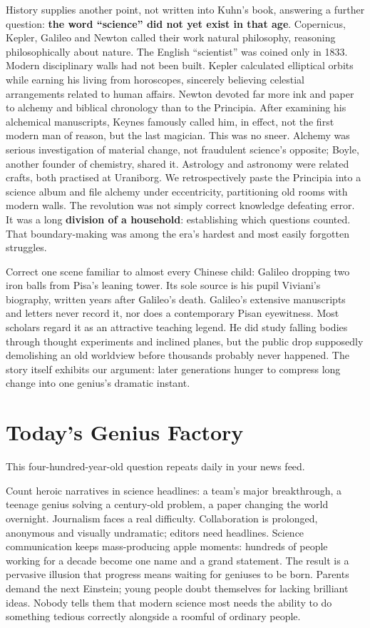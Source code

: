 History supplies another point, not written into Kuhn's book, answering a further question: \textbf{the word ``science'' did not yet exist in that age}. Copernicus, Kepler, Galileo and Newton called their work natural philosophy, reasoning philosophically about nature. The English ``scientist'' was coined only in 1833. Modern disciplinary walls had not been built. Kepler calculated elliptical orbits while earning his living from horoscopes, sincerely believing celestial arrangements related to human affairs. Newton devoted far more ink and paper to alchemy and biblical chronology than to the Principia. After examining his alchemical manuscripts, Keynes famously called him, in effect, not the first modern man of reason, but the last magician. This was no sneer. Alchemy was serious investigation of material change, not fraudulent science's opposite; Boyle, another founder of chemistry, shared it. Astrology and astronomy were related crafts, both practised at Uraniborg. We retrospectively paste the Principia into a science album and file alchemy under eccentricity, partitioning old rooms with modern walls. The revolution was not simply correct knowledge defeating error. It was a long \textbf{division of a household}: establishing which questions counted. That boundary-making was among the era's hardest and most easily forgotten struggles.

Correct one scene familiar to almost every Chinese child: Galileo dropping two iron balls from Pisa's leaning tower. Its sole source is his pupil Viviani's biography, written years after Galileo's death. Galileo's extensive manuscripts and letters never record it, nor does a contemporary Pisan eyewitness. Most scholars regard it as an attractive teaching legend. He did study falling bodies through thought experiments and inclined planes, but the public drop supposedly demolishing an old worldview before thousands probably never happened. The story itself exhibits our argument: later generations hunger to compress long change into one genius's dramatic instant.

\section{Today's Genius Factory}
This four-hundred-year-old question repeats daily in your news feed.

Count heroic narratives in science headlines: a team's major breakthrough, a teenage genius solving a century-old problem, a paper changing the world overnight. Journalism faces a real difficulty. Collaboration is prolonged, anonymous and visually undramatic; editors need headlines. Science communication keeps mass-producing apple moments: hundreds of people working for a decade become one name and a grand statement. The result is a pervasive illusion that progress means waiting for geniuses to be born. Parents demand the next Einstein; young people doubt themselves for lacking brilliant ideas. Nobody tells them that modern science most needs the ability to do something tedious correctly alongside a roomful of ordinary people.

